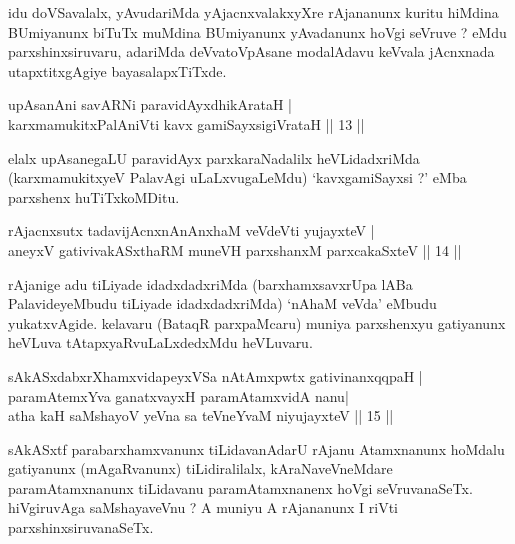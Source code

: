 \begin{artha}
idu doVSavalalx, yAvudariMda yAjacnxvalakxyXre rAjananunx kuritu hiMdina BUmiyanunx biTuTx muMdina BUmiyanunx yAvadanunx hoVgi seVruve ? eMdu parxshinxsiruvaru, adariMda deVvatoVpAsane modalAdavu keVvala jAcnxnada utapxtitxgAgiye bayasalapxTiTxde.
\end{artha}

\begin{shl}
upAsanAni savARNi paravidAyxdhikArataH |\\
karxmamukitxPalAniVti kavx gamiSayxsigiVrataH \hfill || 13 || 
\end{shl}

\begin{artha}
elalx upAsanegaLU paravidAyx parxkaraNadalilx heVLidadxriMda (karxmamukitxyeV PalavAgi uLaLxvugaLeMdu) `kavxgamiSayxsi ?' eMba parxshenx huTiTxkoMDitu.
\end{artha}


\begin{shl}
rAjacnxsutx tadavijAcnxnAnAnxhaM veVdeVti yujayxteV |\\
aneyxV gativivakASxthaRM muneVH parxshanxM parxcakaSxteV \hfill || 14 || 
\end{shl}

\begin{artha}
rAjanige adu tiLiyade idadxdadxriMda (barxhamxsavxrUpa lABa PalavideyeMbudu tiLiyade idadxdadxriMda) `nAhaM veVda' eMbudu yukatxvAgide. kelavaru (BataqR parxpaMcaru) muniya parxshenxyu gatiyanunx heVLuva tAtapxyaRvuLaLxdedxMdu heVLuvaru.
\end{artha}


\begin{shl}
sAkASxdabxrXhamxvidapeyxVSa nA\s \s tAmxpwtx gativinanxqqpaH |\\
paramAtemxYva ganatxvayxH paramAtamxvidA nanu|\\
atha kaH saMshayoV yeVna sa teVneYvaM niyujayxteV \hfill || 15 || 
\end{shl}

\begin{artha}
sAkASxtf parabarxhamxvanunx tiLidavanAdarU rAjanu Atamxnanunx hoMdalu gatiyanunx (mAgaRvanunx) tiLidiralilalx, kAraNaveVneMdare paramAtamxnanunx tiLidavanu paramAtamxnanenx hoVgi seVruvanaSeTx. hiVgiruvAga saMshayaveVnu ? A muniyu A rAjananunx I riVti parxshinxsiruvanaSeTx.
\end{artha}


